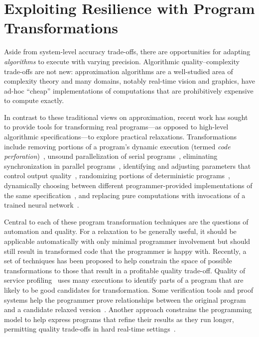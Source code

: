 \section{Exploiting Resilience with Program Transformations}
\label{sec:related:software}

Aside from system-level accuracy trade-offs, there are opportunities for
adapting \emph{algorithms} to execute with varying precision. Algorithmic
quality--complexity trade-offs are not new: approximation algorithms are a
well-studied area of complexity theory and many domains, notably real-time
vision and graphics, have ad-hoc ``cheap'' implementations of computations
that are prohibitively expensive to compute exactly.

In contrast to these
traditional views on approximation, recent work has sought to provide
tools for transforming real programs---as opposed to high-level
algorithmic specifications---to explore practical relaxations.
Transformations include removing portions of a program's dynamic execution
(termed \emph{code perforation})~\cite{perforation}, unsound
parallelization of serial programs~\cite{quickstep}, eliminating
synchronization in parallel programs~\cite{dubstep, races-ibm, hogwild,
forgiving-parallel},
identifying and adjusting parameters that control output
quality~\cite{dynamicknobs}, randomizing portions of deterministic
programs~\cite{zhu-popl12, sasa-sas11}, dynamically choosing between
different programmer-provided implementations of the same
specification~\cite{green, virus, petabricks, taco-soc, ansel-autotuning,
scalable-classifier}, and replacing pure computations with invocations
of a trained neural network~\cite{benchnn, temam-isca, emeuro}.

Central to each of these program transformation techniques are the questions
of automation and quality. For a relaxation to be generally useful, it should
be applicable automatically with only minimal programmer involvement but
should still result in transformed code that the programmer is happy with.
Recently, a set of techniques has been proposed to help constrain the space
of possible transformations to those that result in a profitable
quality trade-off. Quality of service profiling~\cite{qosprof} uses many
executions to identify parts of a program that are likely to be good
candidates for transformation. Some verification tools and proof systems help
the programmer prove relationships between the original program and a
candidate relaxed version~\cite{carbin-pldi, carbin-races, carbin-pepm,
rice-transformation-semantics}.
Another approach constrains the programming model to help express programs
that refine their results as they run longer, permitting quality trade-offs in
hard real-time settings~\cite{chung90}.

